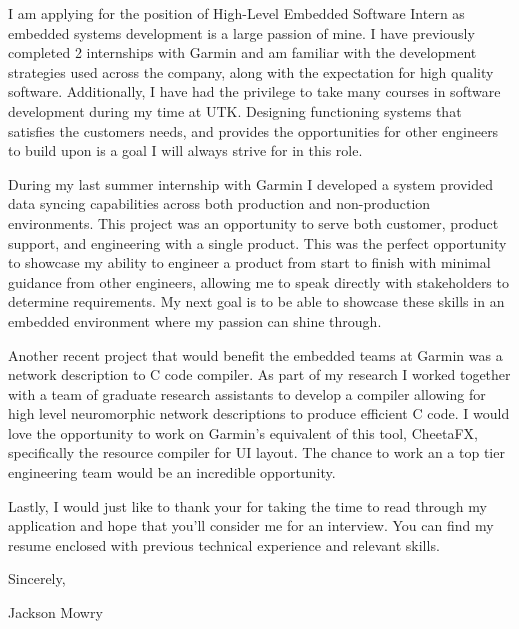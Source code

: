 \documentclass[11pt]{article}
\date{\today}
\title{}
\begin{document}
\tableofcontents

I am applying for the position of High-Level Embedded Software Intern as embedded systems development is a large passion of mine. I have previously completed 2 internships with Garmin and am familiar with the development strategies used across the company, along with the expectation for high quality software. Additionally, I have had the privilege to take many courses in software development during my time at UTK. Designing functioning systems that satisfies the customers needs, and provides the opportunities for other engineers to build upon is a goal I will always strive for in this role.

During my last summer internship with Garmin I developed a system provided data syncing capabilities across both production and non-production environments. This project was an opportunity to serve both customer, product support, and engineering with a single product. This was the perfect opportunity to showcase my ability to engineer a product from start to finish with minimal guidance from other engineers, allowing me to speak directly with stakeholders to determine requirements. My next goal is to be able to showcase these skills in an embedded environment where my passion can shine through.

Another recent project that would benefit the embedded teams at Garmin was a network description to C code compiler. As part of my research I worked together with a team of graduate research assistants to develop a compiler allowing for high level neuromorphic network descriptions to produce efficient C code. I would love the opportunity to work on Garmin's equivalent of this tool, CheetaFX, specifically the resource compiler for UI layout. The chance to work an a top tier engineering team would be an incredible opportunity.

Lastly, I would just like to thank your for taking the time to read through my application and hope that you'll consider me for an interview. You can find my resume enclosed with previous technical experience and relevant skills.

Sincerely,

Jackson Mowry
\end{document}
